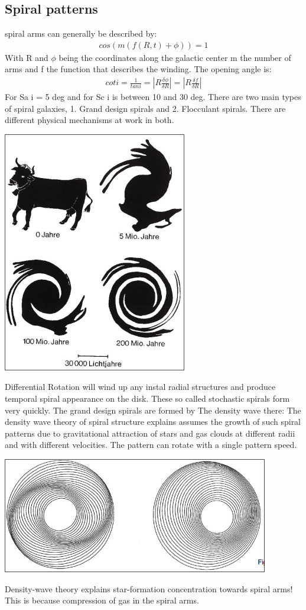 \documentclass[11pt,a4paper]{article}
\begin{document}
\subsection{Spiral patterns}
spiral arms can generally be described by: 
\begin{align*}
   cos (m(f(R,t) + \phi ))  = 1
\end{align*}
With R and $\phi$ being the coordinates along the galactic center m the number of arms and f the function that describes the winding. 
The opening angle is:
\begin{align*}
    cot i = \frac 1 {tan i} = |R \frac {\delta \phi} {\delta R}| =  |R \frac {\delta f} {\delta R}|
\end{align*}
For Sa i = 5 deg and for Sc i is between 10 and 30 deg.
There are two main types of spiral galaxies, 1. Grand design spirals and 2. Flocculant spirals.
There are different physical mechanisms at work in both. 
\begin{center}
    \includegraphics[width=0.3\linewidth]{screenshot_2024-01-26-135659.png}
\end{center}
Differential Rotation will wind up any instal radial structures and produce temporal spiral appearance on the disk. 
These so called stochastic spirals form very quickly.
The grand design spirals are formed by The density wave there:
The density wave theory of spiral structure explains assumes the growth
of such spiral patterns due to gravitational attraction of stars and gas
clouds at different radii and with different velocities. The pattern can rotate with a single pattern speed.
\begin{center}
    \includegraphics[width=0.6\linewidth]{screenshot_2024-01-26-140627.png}
\end{center}
Density-wave theory explains star-formation concentration towards spiral arms!
This is because compression of gas in the spiral arms. 
\end{document}
